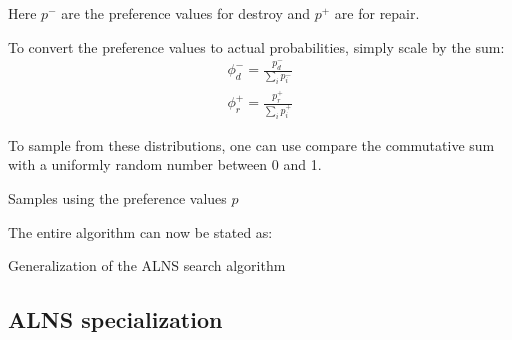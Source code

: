 Here $p^-$ are the preference values for destroy and $p^+$ are for repair.

To convert the preference values to actual probabilities, simply scale by the sum:
\begin{align}
\phi_d^- = \frac{p_d^-}{\sum_{i} p_i^-} \\
\phi_r^+ = \frac{p_r^+}{\sum_{i} p_i^+}
\end{align}

To sample from these distributions, one can use compare the commutative sum with a uniformly random number between 0 and 1.

\begin{algorithm}[H]
  \caption{Samples using the preference values $p$}
  \begin{algorithmic}[1]
      \State {} 
    \EndFunction
  \end{algorithmic}
\end{algorithm}

The entire algorithm can now be stated as:

\begin{algorithm}[H]
  \caption{Generalization of the ALNS search algorithm}
  \begin{algorithmic}[1]
       
       
      \State
      \Repeat
      \State
      \State
      \EndIf
      \State {}
    \EndFunction
  \end{algorithmic}
\end{algorithm}

\subsection{ALNS specialization}


